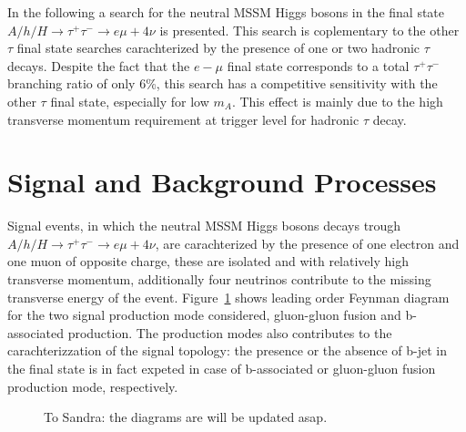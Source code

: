 In the following a search for the neutral MSSM Higgs bosons  in the final state 
$A/h/H \rightarrow \tau^+ \tau^- \rightarrow e \mu +4\nu$ is presented. 
This search is coplementary to the other $\tau$ final state searches 
carachterized by the presence of one or two hadronic $\tau$ decays. Despite the fact that the $e-\mu$ final
state corresponds to a total $\tau^+\tau^-$ branching ratio of only 6\%, this search has a competitive 
sensitivity with the other $\tau$ final state, especially for low $m_A$. 
This effect is mainly due to the high transverse momentum requirement at trigger level for  hadronic $\tau$ decay.




\section{Signal and Background Processes}
Signal events, in which the neutral MSSM Higgs bosons decays trough 
$A/h/H \rightarrow \tau^+ \tau^- \rightarrow e \mu +4\nu$, are carachterized 
by the presence of one electron and one muon of opposite charge, these are isolated and with 
relatively high transverse momentum, additionally four neutrinos contribute to the missing transverse energy of the event. 
Figure~\ref{fig:feyndiagSignal} shows leading order Feynman diagram for the two signal production mode considered,
gluon-gluon fusion and b-associated production.
The production modes also contributes to the carachterizzation of the signal topology: the presence or the absence 
of b-jet in the final state is in fact expeted in case of  b-associated or gluon-gluon fusion production mode, respectively.

\begin{figure}[tp]
     \begin{center}


    \end{center}
    \caption{To Sandra: the diagrams are will be updated asap.}    
	
   \label{fig:feyndiagSignal}
\end{figure}


